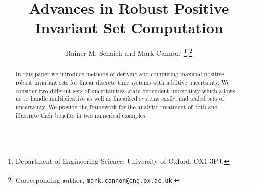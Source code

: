 \documentclass[letterpaper, 10pt, conference]{ieeeconf} %
\begin{document}
  \title{Advances in Robust Positive Invariant Set Computation}

\author{Rainer M. Schaich\textsuperscript{\dag} %
         and Mark Cannon\textsuperscript{\dag,\ddag}%
\thanks{\textsuperscript{\dag} Department of Engineering Science, University of Oxford, OX1 3PJ.}%
\thanks{\textsuperscript{\ddag} Corresponding author, 
        \texttt{mark.cannon@eng.ox.ac.uk}.}
}
\newcommand{\note}[1]{\todo[inline]{#1}}

\maketitle

\begin{abstract} 
In this paper we introduce methods of deriving and computing maximal positive robust invariant
sets for linear discrete time systems with additive uncertainty. We consider two different sets of
uncertainties, state dependent uncertainty which allows us to handle multiplicative as well as
linearised systems easily, and scaled sets of uncertainty. We provide the framework for the analytic
treatment of both and illustrate their benefits in two numerical examples.
\end{abstract}

\begin{keywords}
\vskip-\baselineskip
\end{keywords}
\end{document}
